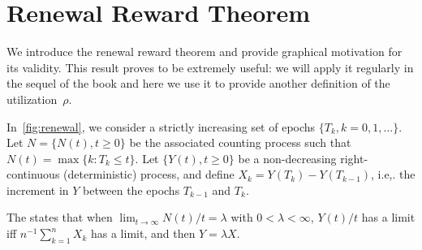 

\section{Renewal Reward Theorem}
\label{sec:renew-reward-theor}


We introduce  the renewal reward theorem and provide graphical motivation for its validity.
This result proves to be extremely useful: we will apply it regularly in the sequel of the book and here we use it to provide another definition of the utilization~$\rho$.


In~\cref{fig:renewal},  we consider a strictly increasing set of epochs $\{T_k, k=0, 1, \ldots\}$.
Let $N=\{N(t), t\geq 0\}$ be the associated counting process such that  $N(t) = \max\{k : T_k \leq t\}$.
Let $\{Y(t), t\geq 0\}$ be a non-decreasing right-continuous (deterministic) process, and define $X_k = Y(T_k)-Y(T_{k-1})$, i.e,.
the increment
in $Y$ between the epochs $T_{k-1}$ and $T_k$.

The  states that when $\lim_{t\to\infty} N(t)/t = \lambda$ with $0<\lambda < \infty$, $Y(t)/t$ has a limit iff $n^{-1}\sum_{k=1}^n X_k$ has a limit, and then $Y=\lambda X$.



